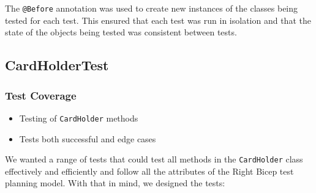 \documentclass{article}
\begin{document}
The \texttt{@Before} annotation was used to create new instances of the classes being tested for each test. This ensured that each test was run in isolation and that the state of the objects being tested was consistent between tests.

\subsection{CardHolderTest}
\subsubsection{Test Coverage}
\begin{itemize}
    \item Testing of \texttt{CardHolder} methods
    \item Tests both successful and edge cases
\end{itemize}
We wanted a range of tests that could test all methods in the \texttt{CardHolder} class effectively and efficiently and follow all the attributes of the Right Bicep test planning model. With that in mind, we designed the tests:
\end{document}
